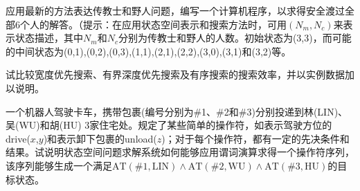 \begin{question}
应用最新的方法表达传教士和野人问题，编写一个计算机程序，以求得安全渡过全部6个人的解答。（提示：在应用状态空间表示和搜索方法时，可用$(N_m,N_c)$来表示状态描述，其中$N_m$和$N_c$分别为传教士和野人的人数。初始状态为(3,3)，而可能的中间状态为(0,1),(0,2),(0,3),(1,1),(2,1),(2,2),(3,0),(3,1)和(3,2)等。
\end{question}
\begin{solution}
\end{solution}

\begin{question}
试比较宽度优先搜索、有界深度优先搜索及有序搜索的搜索效率，并以实例数据加以说明。
\end{question}
\begin{solution}
\end{solution}

\begin{question}
一个机器人驾驶卡车，携带包裹(编号分别为\#1、\#2和\#3)分别投递到林(LIN)、吴(WU)和胡(HU) 3家住宅处。规定了某些简单的操作符，如表示驾驶方位的drive($x$,$y$)和表示卸下包裹的unload($z$)；对于每个操作符，都有一定的先决条件和结果。试说明状态空间问题求解系统如何能够应用谓词演算求得一个操作符序列，该序列能够生成一个满足$\mathrm{AT(\# 1,LIN) \wedge AT(\# 2,WU) \wedge AT(\# 3,HU)}$的目标状态。
\end{question}
\begin{solution}
\end{solution}

